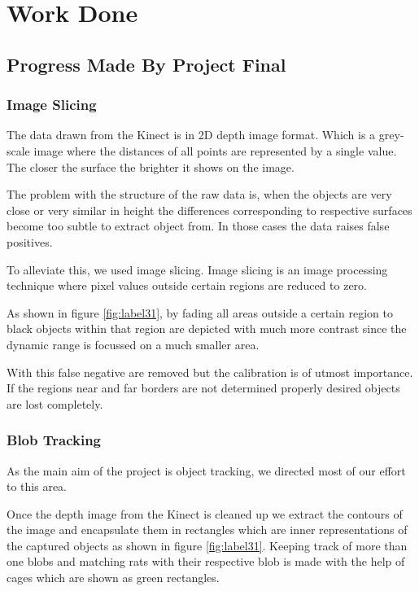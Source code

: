 \chapter{Work Done}

\section{Progress Made By Project Final}

\subsection{Image Slicing}
The data drawn from the Kinect is in 2D depth image format. Which is a grey-scale image where the distances of all points are represented by a single value. The closer the surface the brighter it shows on the image.

The problem with the structure of the raw data is, when the objects are very close or very similar in height the differences corresponding to respective surfaces become too subtle to extract object from. In those cases the data raises false positives.

To alleviate this, we used image slicing. Image slicing is an image processing technique where pixel values outside certain regions are reduced to zero.

As shown in figure \ref{fig:label31}, by fading all areas outside a certain region to black objects within that region are depicted with much more contrast since the dynamic range is focussed on a much smaller area. 

With this false negative are removed but the calibration is of utmost importance. If the regions near and far borders are not determined properly desired objects are lost completely.
\subsection{Blob Tracking}
As the main aim of the project is object tracking, we directed most of our effort to this area.

Once the depth image from the Kinect is cleaned up we extract the contours of the image and encapsulate them in rectangles which are inner representations of the captured objects as shown in figure \ref{fig:label31}. Keeping track of more than one blobs and matching rats with their respective blob is made with the help of cages which are shown as green rectangles.

